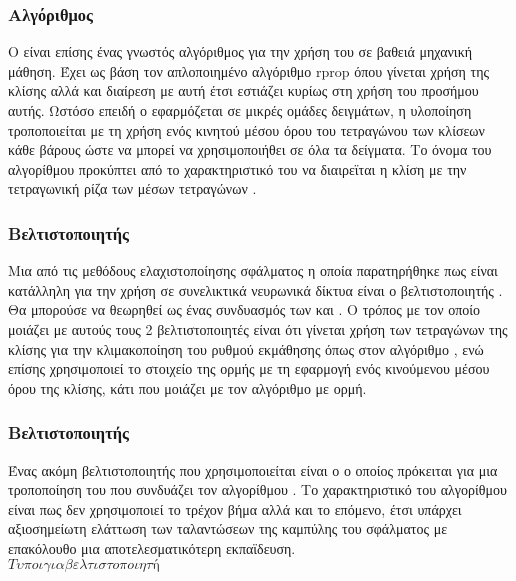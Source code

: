 \subsubsection{Αλγόριθμος }
Ο  είναι επίσης ένας γνωστός αλγόριθμος για την χρήση του σε βαθειά μηχανική μάθηση. Έχει ως βάση τον απλοποιημένο αλγόριθμο rprop όπου γίνεται χρήση της κλίσης αλλά και διαίρεση με αυτή έτσι εστιάζει κυρίως στη χρήση του προσήμου αυτής. Ωστόσο επειδή ο  εφαρμόζεται σε μικρές ομάδες δειγμάτων, η υλοποίηση τροποποιείται με τη χρήση ενός κινητού μέσου όρου του τετραγώνου των κλίσεων κάθε βάρους ώστε να μπορεί να χρησιμοποιήθει σε όλα τα δείγματα. Το όνομα του αλγορίθμου προκύπτει από το χαρακτηριστικό του να διαιρεϊται η κλίση με την τετραγωνική ρίζα των μέσων τετραγώνων .
\subsubsection{Βελτιστοποιητής }
Μια από τις μεθόδους ελαχιστοποίησης σφάλματος η οποία παρατηρήθηκε πως είναι κατάλληλη για την χρήση σε συνελικτικά νευρωνικά δίκτυα είναι ο βελτιστοποιητής . Θα μπορούσε να θεωρηθεί ως ένας συνδυασμός των  και . Ο τρόπος με τον οποίο μοιάζει με αυτούς τους 2 βελτιστοποιητές είναι ότι γίνεται χρήση των τετραγώνων της κλίσης για την κλιμακοποίηση του ρυθμού εκμάθησης όπως στον αλγόριθμο , ενώ επίσης χρησιμοποιεί το στοιχείο της ορμής με τη εφαρμογή ενός κινούμενου μέσου όρου της κλίσης, κάτι που μοιάζει με τον αλγόριθμο  με ορμή.
\subsubsection{Βελτιστοποιητής }
Ένας ακόμη βελτιστοποιητής που χρησιμοποιείται είναι ο  ο οποίος πρόκειται για μια τροποποίηση του  που συνδυάζει τον αλγορίθμου . Το χαρακτηριστικό του αλγορίθμου  είναι πως δεν χρησιμοποιεί το τρέχον βήμα αλλά και το επόμενο, έτσι υπάρχει αξιοσημείωτη ελάττωση των ταλαντώσεων της καμπύλης του σφάλματος με επακόλουθο μια αποτελεσματικότερη εκπαϊδευση.\\

$Τυποι για βελτιστοποιητή$

